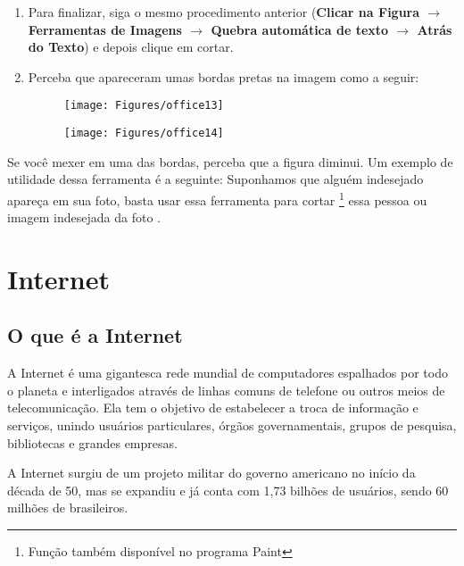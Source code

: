 \documentclass[hidelinks,12pt]{article}
\begin{document}
\begin{enumerate}
			\item Para finalizar, siga o mesmo procedimento anterior (\textbf{Clicar na Figura  $\rightarrow$ Ferramentas de Imagens $\rightarrow$ Quebra automática de texto $\rightarrow$  Atrás do Texto}) e depois clique em cortar.

			\newpage

			\item  Perceba que apareceram umas bordas pretas na imagem como a seguir:
			\begin{figure}[!htbp]
				\centering
				\begin{minipage}[b]{0.6\textwidth}
					\texttt{[image: Figures/office13]}

				\end{minipage}
				\hfill
				\begin{minipage}[b]{0.6\textwidth}
					\texttt{[image: Figures/office14]}

				\end{minipage}
			\end{figure}


		\end{enumerate}

		Se você mexer em uma das bordas, perceba que a figura diminui. Um exemplo de utilidade dessa ferramenta é a seguinte: Suponhamos que alguém indesejado apareça em sua foto, basta usar essa ferramenta para cortar \footnote{Função também disponível no programa Paint} essa pessoa ou imagem indesejada da foto .

		\section{Internet}

		\subsection{O que é a Internet}

		A Internet é uma gigantesca rede mundial de computadores espalhados por todo o planeta e interligados através de linhas comuns de telefone ou outros meios de telecomunicação. Ela tem o objetivo de estabelecer a troca de informação e serviços, unindo usuários particulares, órgãos governamentais, grupos de pesquisa, bibliotecas e grandes empresas.

		A Internet surgiu de um projeto militar do governo americano no início da década de 50, mas se expandiu e já conta com 1,73 bilhões de usuários, sendo 60 milhões de brasileiros.
\end{document}
